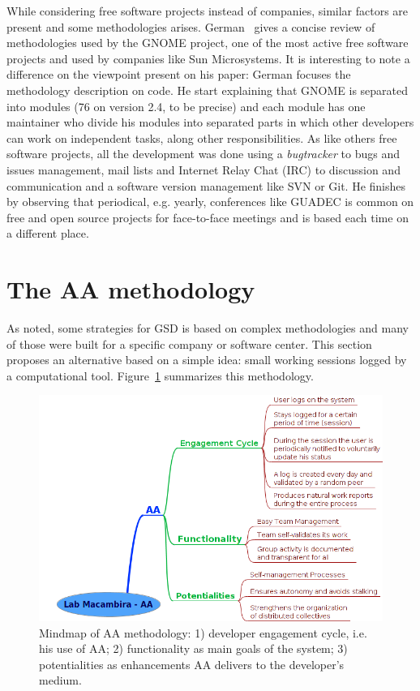 \documentclass[letterpaper]{article}
\begin{document}
While considering free software projects instead of companies, similar factors
are present and some methodologies arises. German~\cite{german2003} gives a
concise review of methodologies used by the GNOME project, one of the most
active free software projects and used by companies like Sun Microsystems. It is
interesting to note a difference on the viewpoint present on his paper: German
focuses the methodology description on code. He start explaining that GNOME is
separated into modules (76 on version 2.4, to be precise) and each module has
one maintainer who divide his modules into separated parts in which other
developers can work on independent tasks, along other responsibilities. As like
others free software projects, all the development was done using a
\emph{bugtracker} to bugs and issues management, mail lists and Internet Relay
Chat (IRC) to discussion and communication and a software version
management like SVN or Git. He finishes by observing that periodical, e.g. yearly, conferences like GUADEC
is common on free and open source projects for face-to-face meetings and is based
each time on a different place.

\section{The AA methodology}
\label{aa-methodology}

As noted, some strategies for GSD is based on complex methodologies and many of
those were built for a specific company or software center. This section proposes an
alternative based on a simple idea: small working sessions logged by
a computational tool. Figure~\ref{fig:mm} summarizes this methodology.

\begin{figure}
\begin{center}
   \includegraphics[width=0.8\linewidth,keepaspectratio=true]{figs/aa-mm2.png}
\end{center}
   \caption{
   Mindmap of AA methodology: 1) developer engagement cycle, i.e. his use of AA; 2) functionality as main goals of the system; 3) potentialities as enhancements AA delivers to the developer's medium. 
   }
\label{fig:mm}
\end{figure}
\end{document}
